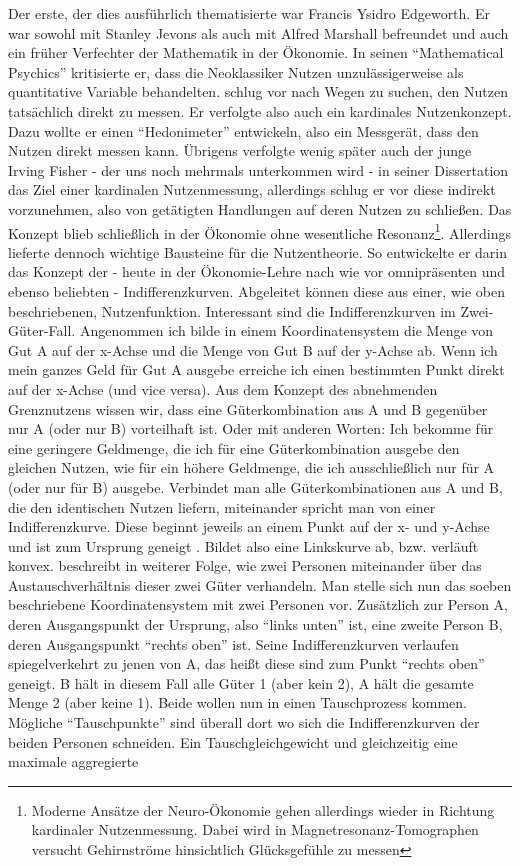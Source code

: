 Der erste, der dies ausführlich thematisierte war Francis Ysidro Edgeworth. Er war sowohl mit Stanley Jevons als auch mit Alfred Marshall befreundet und auch ein früher Verfechter der Mathematik in der Ökonomie. In seinen "`Mathematical Psychics"' \parencite{Edgeworth1881} kritisierte er, dass die Neoklassiker Nutzen unzulässigerweise als quantitative Variable behandelten. \textcite{Edgeworth1881} schlug vor nach Wegen zu suchen, den Nutzen tatsächlich direkt zu messen. Er verfolgte also auch ein kardinales Nutzenkonzept. Dazu wollte er einen "`Hedonimeter"' entwickeln, also ein Messgerät, dass den Nutzen direkt messen kann.  Übrigens verfolgte wenig später auch der junge Irving Fisher - der uns noch mehrmals unterkommen wird - in seiner Dissertation das Ziel einer kardinalen Nutzenmessung, allerdings schlug er vor diese indirekt vorzunehmen, also von getätigten Handlungen auf deren Nutzen zu schließen\parencite{Colander2007}. Das Konzept blieb schließlich in der Ökonomie ohne wesentliche Resonanz\footnote{Moderne Ansätze der Neuro-Ökonomie gehen allerdings wieder in Richtung kardinaler Nutzenmessung. Dabei wird in Magnetresonanz-Tomographen versucht Gehirnströme hinsichtlich Glücksgefühle zu messen}. Allerdings lieferte \textcite{Edgeworth1881} dennoch wichtige Bausteine für die Nutzentheorie. So entwickelte er darin das Konzept der - heute in der Ökonomie-Lehre nach wie vor omnipräsenten und ebenso beliebten - Indifferenzkurven. Abgeleitet können diese aus einer, wie oben beschriebenen, Nutzenfunktion. Interessant sind die Indifferenzkurven im Zwei-Güter-Fall. Angenommen ich bilde in einem Koordinatensystem die Menge von Gut A auf der x-Achse und die Menge von Gut B auf der y-Achse ab. Wenn ich mein ganzes Geld für Gut A ausgebe erreiche ich einen bestimmten Punkt direkt auf der x-Achse (und vice versa). Aus dem Konzept des abnehmenden Grenznutzens wissen wir, dass eine Güterkombination aus A und B gegenüber nur A (oder nur B) vorteilhaft ist. Oder mit anderen Worten: Ich bekomme für eine geringere Geldmenge, die ich für eine Güterkombination ausgebe den gleichen Nutzen, wie für ein höhere Geldmenge, die ich ausschließlich nur für A (oder nur für B) ausgebe. Verbindet man alle Güterkombinationen aus A und B, die den identischen Nutzen liefern, miteinander spricht man von einer Indifferenzkurve. Diese beginnt jeweils an einem Punkt auf der x- und y-Achse und ist zum Ursprung geneigt \parencite[S. 21ff]{Edgeworth1881}. Bildet also eine Linkskurve ab, bzw. verläuft konvex. \textcite{Edgeworth1881} beschreibt in weiterer Folge, wie zwei Personen miteinander über das Austauschverhältnis dieser zwei Güter verhandeln. Man stelle sich nun das soeben beschriebene Koordinatensystem mit zwei Personen vor. Zusätzlich zur Person A, deren Ausgangspunkt der Ursprung, also "`links unten"' ist, eine zweite Person B, deren Ausgangspunkt "`rechts oben"' ist. Seine Indifferenzkurven verlaufen spiegelverkehrt zu jenen von A, das heißt diese sind zum Punkt "`rechts oben"' geneigt. B hält in diesem Fall alle Güter 1 (aber kein 2), A hält die gesamte Menge 2 (aber keine 1). Beide wollen nun in einen Tauschprozess kommen. Mögliche "`Tauschpunkte"' sind überall dort wo sich die Indifferenzkurven der beiden Personen schneiden. Ein Tauschgleichgewicht und gleichzeitig eine maximale aggregierte 